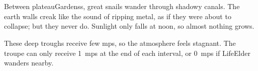 \section{}
\label{shadepaths}

Between \glspl{plateauGardens}, great snails wander through shadowy canals.
The earth walls creak like the sound of ripping metal, as if they were about to collapse; but they never do.
Sunlight only falls at noon, so almost nothing grows.

These deep troughs receive few \glspl{mp}, so the atmosphere feels stagnant.
The troupe can only receive 1~\glspl{mp} at the end of each \gls{interval}, or 0~\glspl{mp} if \gls{LifeElder} wanders nearby.



